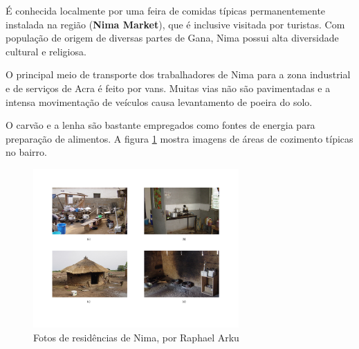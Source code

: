 É conhecida localmente por uma feira de comidas típicas permanentemente 
instalada na região (\textbf{Nima Market}), que é inclusive visitada por turistas.
Com população de origem de diversas partes de Gana, Nima possui 
alta diversidade cultural e religiosa.

O principal meio de transporte dos trabalhadores de Nima para a zona industrial
e de serviços de Acra é feito por vans. 
Muitas vias não são pavimentadas e a intensa movimentação de veículos causa 
levantamento de poeira do solo.

O carvão e a lenha são bastante empregados como fontes de energia para preparação de 
alimentos. A figura \ref{fig:nima} mostra imagens de áreas de cozimento típicas no bairro.

\begin{figure}[H]
  \centering
    \includegraphics[width=0.7\textwidth]{../inputs/images/zheng/nima.pdf}
    \caption{Fotos de residências de Nima, por Raphael Arku \label{fig:nima}}
\end{figure}%
